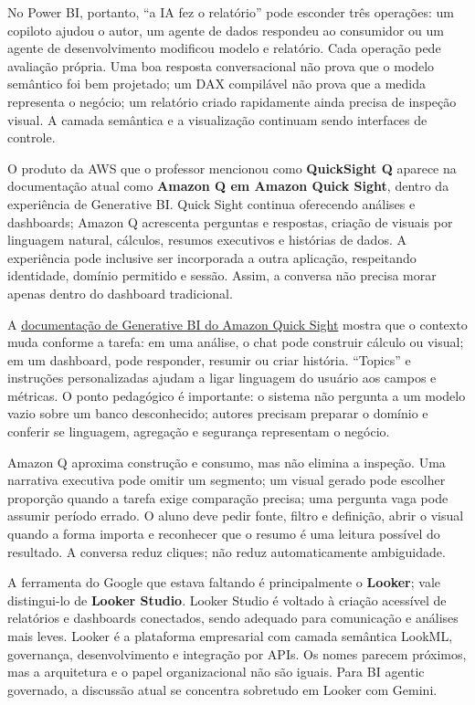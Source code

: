 No Power BI, portanto, ``a IA fez o relatório'' pode esconder três operações: um copiloto ajudou o autor, um agente de dados respondeu ao consumidor ou um agente de desenvolvimento modificou modelo e relatório. Cada operação pede avaliação própria. Uma boa resposta conversacional não prova que o modelo semântico foi bem projetado; um DAX compilável não prova que a medida representa o negócio; um relatório criado rapidamente ainda precisa de inspeção visual. A camada semântica e a visualização continuam sendo interfaces de controle.

O produto da AWS que o professor mencionou como \textbf{QuickSight Q} aparece na documentação atual como \textbf{Amazon Q em Amazon Quick Sight}, dentro da experiência de Generative BI. Quick Sight continua oferecendo análises e dashboards; Amazon Q acrescenta perguntas e respostas, criação de visuais por linguagem natural, cálculos, resumos executivos e histórias de dados. A experiência pode inclusive ser incorporada a outra aplicação, respeitando identidade, domínio permitido e sessão. Assim, a conversa não precisa morar apenas dentro do dashboard tradicional.

A \href{https://docs.aws.amazon.com/quick/latest/userguide/quicksight-gen-bi.html}{documentação de Generative BI do Amazon Quick Sight} mostra que o contexto muda conforme a tarefa: em uma análise, o chat pode construir cálculo ou visual; em um dashboard, pode responder, resumir ou criar história. ``Topics'' e instruções personalizadas ajudam a ligar linguagem do usuário aos campos e métricas. O ponto pedagógico é importante: o sistema não pergunta a um modelo vazio sobre um banco desconhecido; autores precisam preparar o domínio e conferir se linguagem, agregação e segurança representam o negócio.

Amazon Q aproxima construção e consumo, mas não elimina a inspeção. Uma narrativa executiva pode omitir um segmento; um visual gerado pode escolher proporção quando a tarefa exige comparação precisa; uma pergunta vaga pode assumir período errado. O aluno deve pedir fonte, filtro e definição, abrir o visual quando a forma importa e reconhecer que o resumo é uma leitura possível do resultado. A conversa reduz cliques; não reduz automaticamente ambiguidade.

A ferramenta do Google que estava faltando é principalmente o \textbf{Looker}; vale distingui-lo de \textbf{Looker Studio}. Looker Studio é voltado à criação acessível de relatórios e dashboards conectados, sendo adequado para comunicação e análises mais leves. Looker é a plataforma empresarial com camada semântica LookML, governança, desenvolvimento e integração por APIs. Os nomes parecem próximos, mas a arquitetura e o papel organizacional não são iguais. Para BI agentic governado, a discussão atual se concentra sobretudo em Looker com Gemini.

